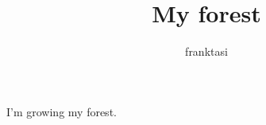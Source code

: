 \documentclass[a4paper]{article}
\title{My forest}
\author{franktasi}
\begin{document}
\maketitle
\par{I'm growing my forest.}
\printbibliography
\end{document}
